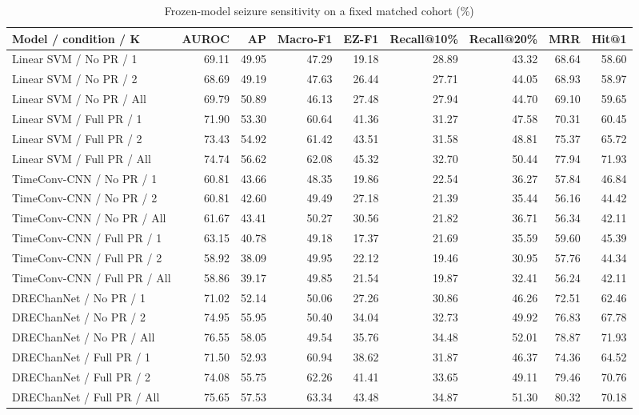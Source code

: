 \begin{table}[t]
\centering
\caption{Frozen-model seizure sensitivity on a fixed matched cohort (\%)}
\small
\begin{tabular}{lrrrrrrrr}
\toprule
Model / condition / K & AUROC & AP & Macro-F1 & EZ-F1 & Recall@10\% & Recall@20\% & MRR & Hit@1 \\
\midrule
Linear SVM / No PR / 1 & 69.11 & 49.95 & 47.29 & 19.18 & 28.89 & 43.32 & 68.64 & 58.60 \\
Linear SVM / No PR / 2 & 68.69 & 49.19 & 47.63 & 26.44 & 27.71 & 44.05 & 68.93 & 58.97 \\
Linear SVM / No PR / All & 69.79 & 50.89 & 46.13 & 27.48 & 27.94 & 44.70 & 69.10 & 59.65 \\
Linear SVM / Full PR / 1 & 71.90 & 53.30 & 60.64 & 41.36 & 31.27 & 47.58 & 70.31 & 60.45 \\
Linear SVM / Full PR / 2 & 73.43 & 54.92 & 61.42 & 43.51 & 31.58 & 48.81 & 75.37 & 65.72 \\
Linear SVM / Full PR / All & 74.74 & 56.62 & 62.08 & 45.32 & 32.70 & 50.44 & 77.94 & 71.93 \\
TimeConv-CNN / No PR / 1 & 60.81 & 43.66 & 48.35 & 19.86 & 22.54 & 36.27 & 57.84 & 46.84 \\
TimeConv-CNN / No PR / 2 & 60.81 & 42.60 & 49.49 & 27.18 & 21.39 & 35.44 & 56.16 & 44.42 \\
TimeConv-CNN / No PR / All & 61.67 & 43.41 & 50.27 & 30.56 & 21.82 & 36.71 & 56.34 & 42.11 \\
TimeConv-CNN / Full PR / 1 & 63.15 & 40.78 & 49.18 & 17.37 & 21.69 & 35.59 & 59.60 & 45.39 \\
TimeConv-CNN / Full PR / 2 & 58.92 & 38.09 & 49.95 & 22.12 & 19.46 & 30.95 & 57.76 & 44.34 \\
TimeConv-CNN / Full PR / All & 58.86 & 39.17 & 49.85 & 21.54 & 19.87 & 32.41 & 56.24 & 42.11 \\
DREChanNet / No PR / 1 & 71.02 & 52.14 & 50.06 & 27.26 & 30.86 & 46.26 & 72.51 & 62.46 \\
DREChanNet / No PR / 2 & 74.95 & 55.95 & 50.40 & 34.04 & 32.73 & 49.92 & 76.83 & 67.78 \\
DREChanNet / No PR / All & 76.55 & 58.05 & 49.54 & 35.76 & 34.48 & 52.01 & 78.87 & 71.93 \\
DREChanNet / Full PR / 1 & 71.50 & 52.93 & 60.94 & 38.62 & 31.87 & 46.37 & 74.36 & 64.52 \\
DREChanNet / Full PR / 2 & 74.08 & 55.75 & 62.26 & 41.41 & 33.65 & 49.11 & 79.46 & 70.76 \\
DREChanNet / Full PR / All & 75.65 & 57.53 & 63.34 & 43.48 & 34.87 & 51.30 & 80.32 & 70.18 \\
\bottomrule
\end{tabular}
\end{table}
